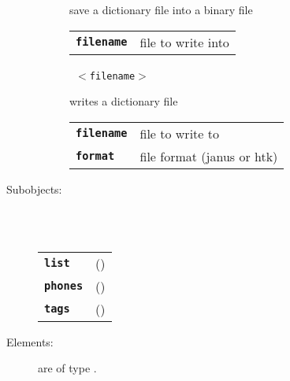 \begin{description}
\begin{description}
        save a dictionary file into a binary file

      \begin{tabular}{ll}
 \texttt{\textbf{filename}} &  file to write into  \\
      \end{tabular}
       \texttt{ $<$filename$>$ } \

        writes a dictionary file

      \begin{tabular}{ll}
 \texttt{\textbf{filename}} &  file to write to  \\
 \texttt{\textbf{format}} &     file format (janus or htk)  \\
      \end{tabular}
    \end{description}

  \item[Subobjects:] \hfill \\
\ 
    \begin{tabular}{ll}
      \texttt{\textbf{list}} & (\Jref{module}{List}) \\
      \texttt{\textbf{phones}} & (\Jref{module}{Phones}) \\
      \texttt{\textbf{tags}} & (\Jref{module}{Phones}) \\
    \end{tabular}
\vspace{3mm}

  \item[Elements:] are of type .


\end{description}

